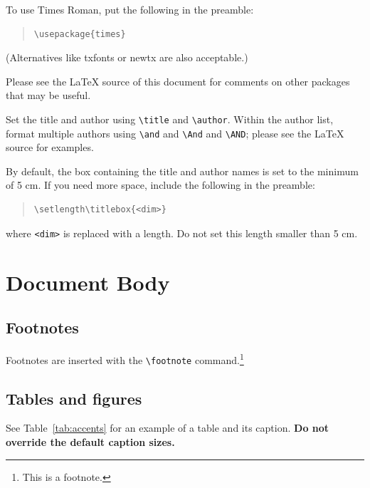 \documentclass[11pt]{article}
\begin{document}
To use Times Roman, put the following in the preamble:
\begin{quote}
\begin{verbatim}
\usepackage{times}
\end{verbatim}
\end{quote}
(Alternatives like txfonts or newtx are also acceptable.)

Please see the \LaTeX{} source of this document for comments on other packages that may be useful.

Set the title and author using \verb|\title| and \verb|\author|. Within the author list, format multiple authors using \verb|\and| and \verb|\And| and \verb|\AND|; please see the \LaTeX{} source for examples.

By default, the box containing the title and author names is set to the minimum of 5 cm. If you need more space, include the following in the preamble:
\begin{quote}
\begin{verbatim}
\setlength\titlebox{<dim>}
\end{verbatim}
\end{quote}
where \verb|<dim>| is replaced with a length. Do not set this length smaller than 5 cm.

\section{Document Body}

\subsection{Footnotes}

Footnotes are inserted with the \verb|\footnote| command.\footnote{This is a footnote.}

\subsection{Tables and figures}

See Table~\ref{tab:accents} for an example of a table and its caption.
\textbf{Do not override the default caption sizes.}
\end{document}

